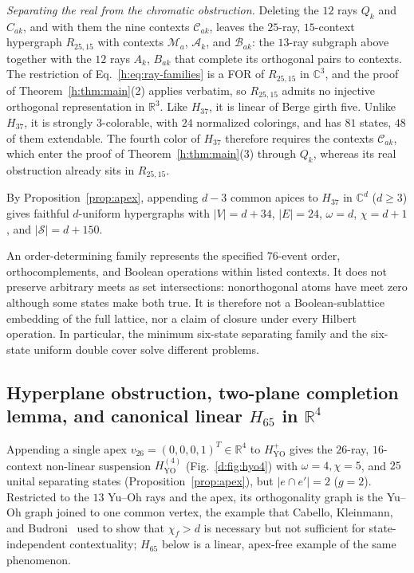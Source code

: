 \documentclass[aps,pra,reprint,superscriptaddress,longbibliography,nofootinbib,floatfix,10pt]{revtex4-2}
\theoremstyle{definition}\newtheorem{definition}[theorem]{Definition}
\theoremstyle{remark}\newtheorem{remark}[theorem]{Remark}
\newcommand{\C}{\mathbb C}\newcommand{\R}{\mathbb R}\newcommand{\Q}{\mathbb Q}
\newcommand{\Sc}{\mathcal S}\newcommand{\Cc}{\mathcal C}
\newcommand{\YO}{\mathrm{YO}}\newcommand{\ip}[2]{\langle #1,#2\rangle}
\begin{document}
\emph{Separating the real from the chromatic obstruction.} Deleting the $12$ rays $Q_k$ and $C_{ak}$, and with them the nine contexts $\mathcal C_{ak}$, leaves the $25$-ray, $15$-context hypergraph $R_{25,15}$ with contexts $\mathcal M_a$, $\mathcal A_k$, and $\mathcal B_{ak}$: the $13$-ray subgraph above together with the $12$ rays $A_k$, $B_{ak}$ that complete its orthogonal pairs to contexts. The restriction of Eq.~\eqref{h:eq:ray-families} is a FOR of $R_{25,15}$ in $\C^3$, and the proof of Theorem~\ref{h:thm:main}(2) applies verbatim, so $R_{25,15}$ admits no injective orthogonal representation in $\R^3$. Like $H_{37}$, it is linear of Berge girth five. Unlike $H_{37}$, it is strongly $3$-colorable, with $24$ normalized colorings, and has $81$ states, $48$ of them extendable. The fourth color of $H_{37}$ therefore requires the contexts $\mathcal C_{ak}$, which enter the proof of Theorem~\ref{h:thm:main}(3) through $Q_k$, whereas its real obstruction already sits in $R_{25,15}$.

By Proposition~\ref{prop:apex}, appending $d-3$ common apices to $H_{37}$ in $\C^d$ ($d\ge3$) gives faithful $d$-uniform hypergraphs with $|V|=d+34$, $|E|=24$, $\omega=d$, $\chi=d+1$, and $|\Sc|=d+150$.

An order-determining family represents the specified 76-event order, orthocomplements, and Boolean operations within listed contexts. It does not preserve arbitrary meets as set intersections: nonorthogonal atoms have meet zero although some states make both true. It is therefore not a Boolean-sublattice embedding of the full lattice, nor a claim of closure under every Hilbert operation. In particular, the minimum six-state separating family and the six-state uniform double cover solve different problems.

\subsection{Hyperplane obstruction, two-plane completion lemma, and canonical linear \texorpdfstring{$H_{65}$}{H65} in \texorpdfstring{$\R^4$}{R4}}

Appending a single apex $v_{26}=(0,0,0,1)^T\in\R^4$ to $H_{\YO}^{+}$ gives the $26$-ray, $16$-context non-linear suspension $H_{\YO}^{(4)}$ (Fig.~\ref{d:fig:hyo4}) with $\omega=4,\chi=5$, and $25$ unital separating states (Proposition~\ref{prop:apex}), but $|e\cap e'|=2$ ($g=2$). Restricted to the $13$ Yu--Oh rays and the apex, its orthogonality graph is the Yu--Oh graph joined to one common vertex, the example that Cabello, Kleinmann, and Budroni~\cite[Thm.~1]{cabello2015sic} used to show that $\chi_f>d$ is necessary but not sufficient for state-independent contextuality; $H_{65}$ below is a linear, apex-free example of the same phenomenon.
\end{document}
